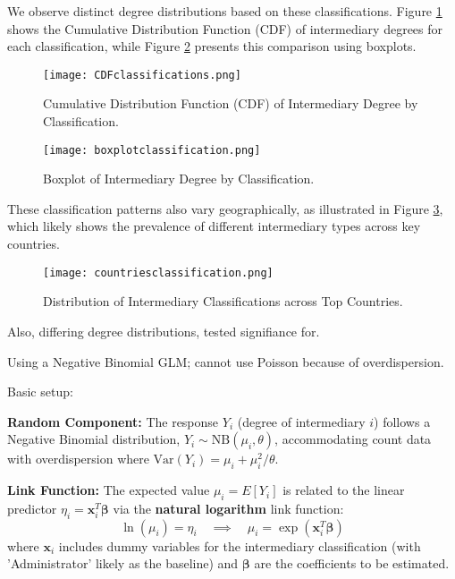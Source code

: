 We observe distinct degree distributions based on these classifications. Figure \ref{fig:cdf_classifications} shows the Cumulative Distribution Function (CDF) of intermediary degrees for each classification, while Figure \ref{fig:boxplot_classifications} presents this comparison using boxplots.

\begin{figure}[htbp]
    \centering
    \texttt{[image: CDFclassifications.png]}
    \caption{Cumulative Distribution Function (CDF) of Intermediary Degree by Classification.}
    \label{fig:cdf_classifications}
\end{figure}

\begin{figure}[htbp]
    \centering
    \texttt{[image: boxplotclassification.png]}
    \caption{Boxplot of Intermediary Degree by Classification.}
    \label{fig:boxplot_classifications}
\end{figure}

These classification patterns also vary geographically, as illustrated in Figure \ref{fig:countries_classifications}, which likely shows the prevalence of different intermediary types across key countries.

\begin{figure}[htbp]
    \centering
    \texttt{[image: countriesclassification.png]}
    \caption{Distribution of Intermediary Classifications across Top Countries.}
    \label{fig:countries_classifications}
\end{figure}

Also, differing degree distributions, tested signifiance for.

Using a Negative Binomial GLM; cannot use Poisson because of overdispersion. 

Basic setup:

\textbf{Random Component:} The response $Y_i$ (degree of intermediary $i$) follows a Negative Binomial distribution, $Y_i \sim \text{NB}(\mu_i, \theta)$, accommodating count data with overdispersion where $\text{Var}(Y_i) = \mu_i + \mu_i^2 / \theta$.

\textbf{Link Function:} The expected value $\mu_i = E[Y_i]$ is related to the linear predictor $\eta_i = \mathbf{x}_i^T \boldsymbol{\beta}$ via the \textbf{natural logarithm} link function:
\[
    \ln(\mu_i) = \eta_i \quad \implies \quad \mu_i = \exp(\mathbf{x}_i^T \boldsymbol{\beta})
\]
where $\mathbf{x}_i$ includes dummy variables for the intermediary classification (with 'Administrator' likely as the baseline) and $\boldsymbol{\beta}$ are the coefficients to be estimated.

